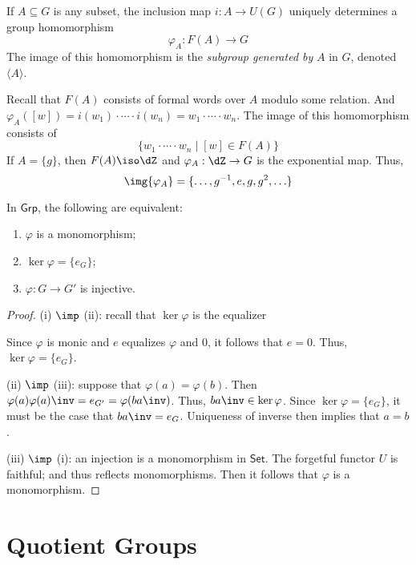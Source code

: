 \documentclass{amsart}
\begin{document}
\begin{eg}
  If $A \subseteq G$ is any subset, the inclusion map $i : A \to U(G)$ uniquely determines a group homomorphism
  \[
    \varphi_{A} : F(A) \to G
  \]
  The image of this homomorphism is the \emph{subgroup generated by} $A$ in $G$, denoted $\langle A \rangle$.
  

  Recall that $F(A)$ consists of formal words over $A$ modulo some relation.
  And $\varphi_{A}([w]) = i(w_{1}) \cdot \cdots \cdot i(w_{n}) = w_{1} \cdot \cdots \cdot w_{n}$.
  The image of this homomorphism consists of
  \[
    \{w_{1} \cdot \cdots \cdot w_{n} \mid [w] \in F(A)\}
  \]
  If $A = \{g\}$, then $F(A) \iso \dZ$ and $\varphi_{A} : \dZ \to G$ is the exponential map.
  Thus,
  \[
    \img{\varphi_{A}} = \{\ldots,g^{-1} , e, g, g^{2},\ldots\}
  \]
\end{eg}

\begin{lem}
  In $\mathsf{Grp}$, the following are equivalent:
  \begin{enumerate}
  \item $\varphi$ is a monomorphism;
  \item $\ker{\varphi} = \{e_{G}\}$;
  \item $\varphi : G \to G'$ is injective.
  \end{enumerate}
\end{lem}
\begin{proof}
  (i) $\imp$ (ii): recall that $\ker{\varphi}$ is the equalizer
  
  Since $\varphi$ is monic and $e$ equalizes $\varphi$ and $0$, it follows that $e = 0$.
  Thus, $\ker{\varphi} = \{e_{G}\}$.

  (ii) $\imp$ (iii): suppose that $\varphi(a) = \varphi(b)$.
  Then $\varphi(a)\varphi(a)\inv = e_{G'} = \varphi(ba\inv)$.
  Thus, $ba\inv \in \ker{\varphi}$.
  Since $\ker{\varphi} = \{e_{G}\}$, it must be the case that $ba\inv = e_{G}$.
  Uniqueness of inverse then implies that $a = b$.

  (iii) $\imp$ (i): an injection is a monomorphism in $\mathsf{Set}$.
  The forgetful functor $U$ is faithful; and thus reflects monomorphisms.
  Then it follows that $\varphi$ is a monomorphism.
\end{proof}

\section{Quotient Groups}
\label{sec:quotient-groups}
\end{document}
